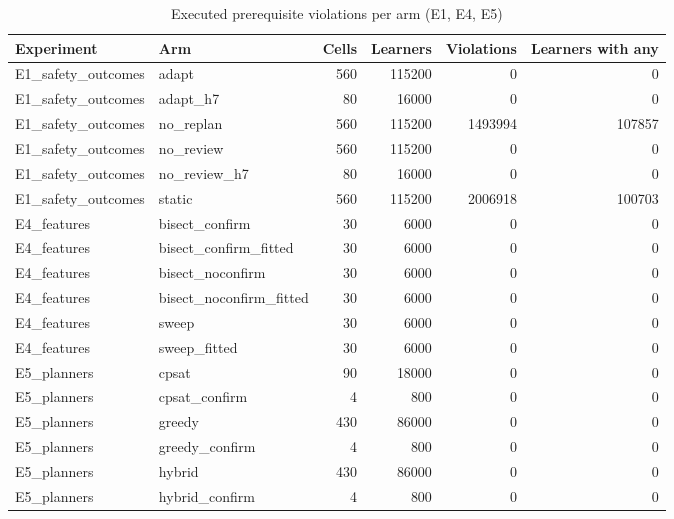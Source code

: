 \begin{table}[htbp]
\centering\small
\caption{Executed prerequisite violations per arm (E1, E4, E5)}
\label{tab:t1}
\begin{tabular}{llrrrr}
\toprule
Experiment & Arm & Cells & Learners & Violations & Learners with any \\
\midrule
E1\_safety\_outcomes & adapt & 560 & 115200 & 0 & 0 \\
E1\_safety\_outcomes & adapt\_h7 & 80 & 16000 & 0 & 0 \\
E1\_safety\_outcomes & no\_replan & 560 & 115200 & 1493994 & 107857 \\
E1\_safety\_outcomes & no\_review & 560 & 115200 & 0 & 0 \\
E1\_safety\_outcomes & no\_review\_h7 & 80 & 16000 & 0 & 0 \\
E1\_safety\_outcomes & static & 560 & 115200 & 2006918 & 100703 \\
E4\_features & bisect\_confirm & 30 & 6000 & 0 & 0 \\
E4\_features & bisect\_confirm\_fitted & 30 & 6000 & 0 & 0 \\
E4\_features & bisect\_noconfirm & 30 & 6000 & 0 & 0 \\
E4\_features & bisect\_noconfirm\_fitted & 30 & 6000 & 0 & 0 \\
E4\_features & sweep & 30 & 6000 & 0 & 0 \\
E4\_features & sweep\_fitted & 30 & 6000 & 0 & 0 \\
E5\_planners & cpsat & 90 & 18000 & 0 & 0 \\
E5\_planners & cpsat\_confirm & 4 & 800 & 0 & 0 \\
E5\_planners & greedy & 430 & 86000 & 0 & 0 \\
E5\_planners & greedy\_confirm & 4 & 800 & 0 & 0 \\
E5\_planners & hybrid & 430 & 86000 & 0 & 0 \\
E5\_planners & hybrid\_confirm & 4 & 800 & 0 & 0 \\
\bottomrule
\end{tabular}
\end{table}
